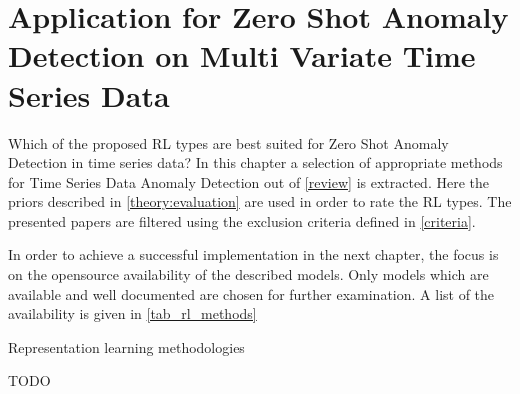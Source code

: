 \section{Application for Zero Shot Anomaly Detection on Multi Variate Time Series Data}\label{application}
 Which of the proposed RL types are best suited for Zero Shot Anomaly Detection in time series data? In this chapter a selection of appropriate methods for Time Series Data Anomaly Detection out of \ref{review} is extracted. Here the priors described in \ref{theory:evaluation} are used in order to rate the RL types. The presented papers are filtered using the exclusion criteria defined in \ref{criteria}.

 In order to achieve a successful implementation in the next chapter, the focus is on the opensource availability of the described models. Only models which are available and well documented are chosen for further examination. A list of the availability is given in \ref{tab_rl_methods}
 \begin{table}
   \caption{Representation learning methodologies}\label{tab_rl_methods}
   
 \end{table}
TODO \cite{fung_model_2024}  %
